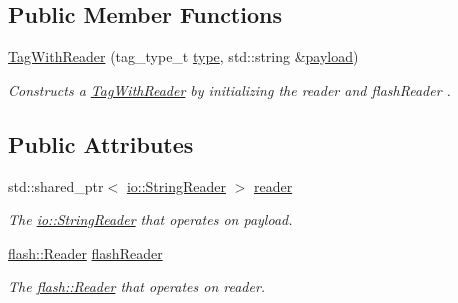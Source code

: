\subsection*{Public Member Functions}
\begin{DoxyCompactItemize}
\item 
\hypertarget{classjswf_1_1flash_1_1tags_1_1_tag_with_reader_a10230cfb6773ce9cf0da257a2a7a6dbb}{\hyperlink{classjswf_1_1flash_1_1tags_1_1_tag_with_reader_a10230cfb6773ce9cf0da257a2a7a6dbb}{Tag\+With\+Reader} (tag\+\_\+type\+\_\+t \hyperlink{classjswf_1_1flash_1_1tags_1_1_tag_a3152409242986a8c0c89156f1dabc5e2}{type}, std\+::string \&\hyperlink{classjswf_1_1flash_1_1tags_1_1_tag_a56525f85068803819fa64e868801c492}{payload})}\label{classjswf_1_1flash_1_1tags_1_1_tag_with_reader_a10230cfb6773ce9cf0da257a2a7a6dbb}

\begin{DoxyCompactList}\small\item\em Constructs a \hyperlink{classjswf_1_1flash_1_1tags_1_1_tag_with_reader}{Tag\+With\+Reader} by initializing the reader and flash\+Reader . \end{DoxyCompactList}\end{DoxyCompactItemize}
\subsection*{Public Attributes}
\begin{DoxyCompactItemize}
\item 
\hypertarget{classjswf_1_1flash_1_1tags_1_1_tag_with_reader_a609919207e56da6f6be8a6086d05182d}{std\+::shared\+\_\+ptr$<$ \hyperlink{classjswf_1_1io_1_1_string_reader}{io\+::\+String\+Reader} $>$ \hyperlink{classjswf_1_1flash_1_1tags_1_1_tag_with_reader_a609919207e56da6f6be8a6086d05182d}{reader}}\label{classjswf_1_1flash_1_1tags_1_1_tag_with_reader_a609919207e56da6f6be8a6086d05182d}

\begin{DoxyCompactList}\small\item\em The \hyperlink{classjswf_1_1io_1_1_string_reader}{io\+::\+String\+Reader} that operates on payload. \end{DoxyCompactList}\item 
\hypertarget{classjswf_1_1flash_1_1tags_1_1_tag_with_reader_a55cfe7efbda18e06dfd9b7b48c3067aa}{\hyperlink{classjswf_1_1flash_1_1_reader}{flash\+::\+Reader} \hyperlink{classjswf_1_1flash_1_1tags_1_1_tag_with_reader_a55cfe7efbda18e06dfd9b7b48c3067aa}{flash\+Reader}}\label{classjswf_1_1flash_1_1tags_1_1_tag_with_reader_a55cfe7efbda18e06dfd9b7b48c3067aa}

\begin{DoxyCompactList}\small\item\em The \hyperlink{classjswf_1_1flash_1_1_reader}{flash\+::\+Reader} that operates on reader. \end{DoxyCompactList}\end{DoxyCompactItemize}


